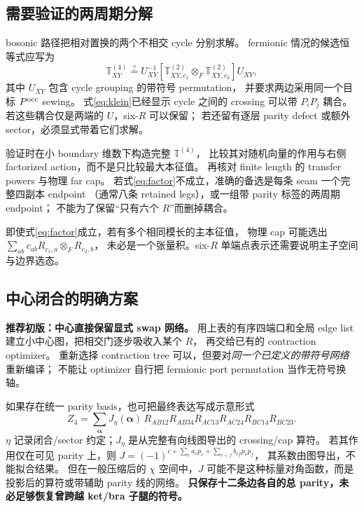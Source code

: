 \documentclass[11pt]{article}
\begin{document}
\subsection{需要验证的两周期分解}

bosonic 路径把相对置换的两个不相交 cycle 分别求解。
fermionic 情况的候选恒等式应写为
\begin{equation}
 \mathbb T^{(4)}_{XY}
 \stackrel{?}{=}U_{XY}^{-1}
 [\mathbb T^{(2)}_{XY,c_1}\otimes_F\mathbb T^{(2)}_{XY,c_2}]U_{XY},
 \label{eq:factor}
\end{equation}
其中 $U_{XY}$ 包含 cycle grouping 的带符号 permutation，
并要求两边采用同一个目标 $P^{\rm occ}$ sewing。
式\eqref{eq:klein}已经显示 cycle 之间的 crossing 可以带 $P_iP_j$ 耦合。
若这些耦合仅是两端的 $U$，six-$R$ 可以保留；
若还留有逐层 parity defect 或额外 sector，必须显式带着它们求解。

验证时在小 boundary 维数下构造完整 $\mathbb T^{(4)}$，
比较其对随机向量的作用与右侧 factorized action，而不是只比较最大本征值。
再核对 finite length 的 transfer powers 与物理 far cap。
若式\eqref{eq:factor}不成立，准确的备选是每条 seam 一个完整四副本 endpoint
（通常八条 retained legs），或一组带 parity 标签的两周期 endpoint；
不能为了保留“只有六个 $R$”而删掉耦合。

即使式\eqref{eq:factor}成立，若有多个相同模长的主本征值，
物理 cap 可能选出 $\sum_{ab}c_{ab}R_{c_1,a}\otimes_F R_{c_2,b}$，
未必是一个张量积。six-$R$ 单端点表示还需要说明主子空间与边界选态。

\subsection{中心闭合的明确方案}

\textbf{推荐初版：中心直接保留显式 swap 网络。}
用上表的有序四端口和全局 edge list 建立小中心图，把相交门逐步吸收入某个 $R$，
再交给已有的 contraction optimizer。
重新选择 contraction tree 可以，但要对\emph{同一个已定义的带符号网络}重新编译；
不能让 optimizer 自行把 fermionic port permutation 当作无符号换轴。

如果存在统一 parity basis，也可把最终表达写成示意形式
\begin{equation}
 Z_4=\sum_{\boldsymbol\alpha}
 J_\eta(\boldsymbol\alpha)\,
 R_{AB12}R_{AB34}R_{AC13}R_{AC24}R_{BC14}R_{BC23}.
 \label{eq:junction}
\end{equation}
$\eta$ 记录闭合/sector 约定；$J_\eta$ 是从完整有向线图导出的 crossing/cap 算符。
若其作用仅在可见 parity 上，则
$J=(-1)^{c+\sum_e a_ep_e+\sum_{e<f}b_{ef}p_ep_f}$，
其系数由图导出，不能拟合结果。
但在一般压缩后的 $\chi$ 空间中，$J$ 可能不是这种标量对角函数，而是投影后的算符或带辅助 parity 线的网络。
\textbf{只保存十二条边各自的总 parity，未必足够恢复曾跨越 ket/bra 子腿的符号。}
\end{document}
